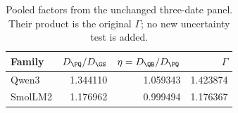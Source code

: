 \begin{table}[htbp]\centering\small
\caption{Pooled factors from the unchanged three-date panel. Their product is the original $\Gamma$; no new uncertainty test is added.}\label{tab:scopefactors}
\setlength{\tabcolsep}{3pt}
\begin{tabular}{@{}lrrr@{}}\toprule
Family & $D_{\PQ}/D_{\GS}$ & $\eta=D_{\QB}/D_{\PQ}$ & $\Gamma$\\\midrule
Qwen3 & 1.344110 & 1.059343 & 1.423874\\
SmolLM2 & 1.176962 & 0.999494 & 1.176367\\
\bottomrule\end{tabular}
\end{table}

